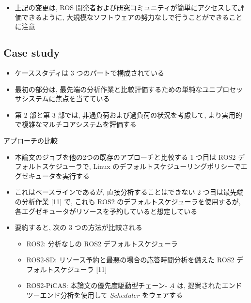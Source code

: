 \begin{frame}{}
    \begin{itemize}
        \item 上記の変更は, ROS 開発者および研究コミュニティが簡単にアクセスして評価できるように, 大規模なソフトウェアの努力なしで行うことができることに注意
    \end{itemize}
\end{frame}


\subsection{Case study}
\label{ssec: case study}

\begin{frame}{}
    \begin{itemize}
        \item ケーススタディは 3 つのパートで構成されている
\item 最初の部分は, 最先端の分析作業と比較評価するための単純なユニプロセッサシステムに焦点を当てている
\item 第 2 部と第 3 部では, 非過負荷および過負荷の状況を考慮して, より実用的で複雑なマルチコアシステムを評価する
    \end{itemize}
\end{frame}

\begin{frame}{アプローチの比較}
    \begin{itemize}
        \item 本論文のジョブを他の2つの既存のアプローチと比較する 1 つ目は ROS2 デフォルトスケジューラで, Linux のデフォルトスケジューリングポリシーでエグゼキュータを実行する
\item これはベースラインであるが, 直接分析することはできない 2 つ目は最先端の分析作業 [11] で, これも ROS2 のデフォルトスケジューラを使用するが, 各エグゼキュータがリソースを予約していると想定している
\item 要約すると, 次の 3 つの方法が比較される

              \begin{itemize}
                  \item  ROS2: 分析なしの ROS2 デフォルトスケジューラ

                  \item  ROS2-SD: リソース予約と最悪の場合の応答時間分析を備えた ROS2 デフォルトスケジューラ [11]

                  \item  ROS2-PiCAS: 本論文の優先度駆動型チェーン- $\underline{A}$ は, 提案されたエンドツーエンド分析を使用して $\underline{S} c h e d u l e r$ をウェアする

              \end{itemize}
    \end{itemize}
\end{frame}

